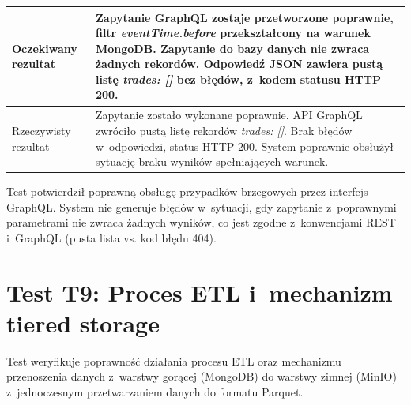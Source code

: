 \begin{table}[H]
\begin{tabular}{|p{}|p{}|}
        Oczekiwany rezultat  & Zapytanie GraphQL zostaje przetworzone poprawnie, filtr \textit{eventTime.before} przekształcony na warunek MongoDB\@. Zapytanie do bazy danych nie zwraca żadnych rekordów. Odpowiedź JSON zawiera pustą listę \textit{trades: []} bez błędów, z~kodem statusu HTTP 200.                                                                                                                          \\ \hline
        Rzeczywisty rezultat & Zapytanie zostało wykonane poprawnie. API GraphQL zwróciło pustą listę rekordów \textit{trades: []}. Brak błędów w~odpowiedzi, status HTTP 200. System poprawnie obsłużył sytuację braku wyników spełniających warunek.                                                                                                                                                                            \\ \hline
    \end{tabular}
\end{table}

Test potwierdził poprawną obsługę przypadków brzegowych przez interfejs GraphQL\@.
System nie generuje błędów w~sytuacji, gdy zapytanie z~poprawnymi parametrami nie zwraca żadnych wyników, co jest
zgodne z~konwencjami REST i~GraphQL (pusta lista vs. kod błędu 404).

\newpage


\section[Test T9: Proces ETL i mechanizm tiered storage]{Test T9: Proces ETL i~mechanizm tiered storage}
\label{sec:test_etl_tiered_storage}

Test weryfikuje poprawność działania procesu ETL oraz mechanizmu przenoszenia danych z~warstwy gorącej (MongoDB) do
warstwy zimnej (MinIO) z~jednoczesnym przetwarzaniem danych do formatu Parquet.

\vspace{0.5cm}

